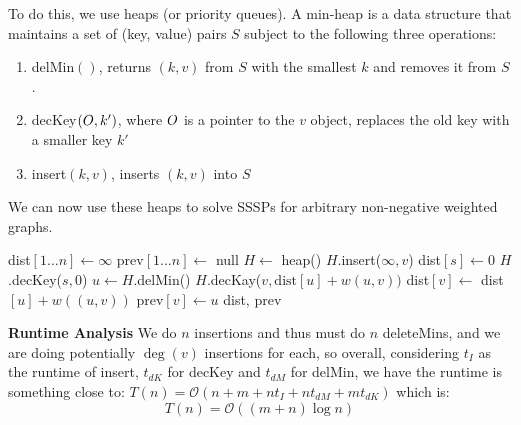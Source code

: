 To do this, we use heaps (or priority queues). A min-heap is a data structure that maintains a set of (key, value) pairs $S$ subject to the following
three operations:
\begin{enumerate}
    \item delMin$()$, returns $(k, v)$ from $S$ with the smallest $k$ and removes it from $S$.
    \item decKey$(\*O, k')$, where $\*O$ is a pointer to the $v$ object, replaces the old key with a smaller key $k'$
    \item insert$(k, v)$, inserts $(k, v)$ into $S$
\end{enumerate}

We can now use these heaps to solve SSSPs for arbitrary non-negative weighted graphs.
\begin{algothm}
    \begin{algorithmic}
            \State dist$[1\dots n] \gets \infty$
            \State prev$[1\dots n] \gets$ null
            \State $H \gets$ heap()
                \State $H$.insert($\infty, v$)
            \EndFor
            \State dist$[s] \gets 0$
            \State $H$.decKey($s, 0$)
                \State $u \gets H$.delMin()
                        \State $H$.decKay($v, \text{dist}[u] + w(u, v))$
                        \State dist$[v] \gets$ dist$[u] + w((u, v))$
                        \State prev$[v] \gets u$
                    \EndIf
                \EndFor
            \EndWhile
            \State \Return dist, prev
        \EndFunction
    \end{algorithmic}

    \textbf{Runtime Analysis}
    We do $n$ insertions and thus must do $n$ deleteMins, and we are doing potentially $\deg(v)$ insertions for each, so overall, considering $t_I$ as the runtime of insert,
    $t_{dK}$ for decKey and $t_{dM}$ for delMin, we have the runtime is something close to:
    $T(n) = \mathcal{O}(n + m + nt_I + nt_{dM} + mt_{dK})$ which is:
    \[ T(n)  = \mathcal{O}((m + n) \log n) \]
\end{algothm}
